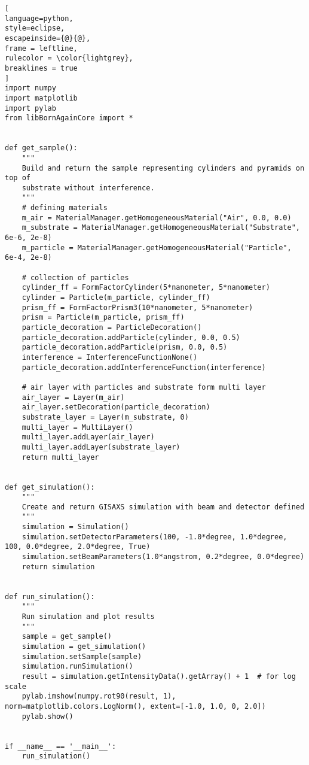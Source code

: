 \begin{lstlisting}[
language=python, 
style=eclipse, 
escapeinside={@}{@},
frame = leftline, 
rulecolor = \color{lightgrey},
breaklines = true
]
import numpy
import matplotlib
import pylab
from libBornAgainCore import *


def get_sample():
    """
    Build and return the sample representing cylinders and pyramids on top of
    substrate without interference.
    """
    # defining materials
    m_air = MaterialManager.getHomogeneousMaterial("Air", 0.0, 0.0)
    m_substrate = MaterialManager.getHomogeneousMaterial("Substrate", 6e-6, 2e-8)
    m_particle = MaterialManager.getHomogeneousMaterial("Particle", 6e-4, 2e-8)

    # collection of particles
    cylinder_ff = FormFactorCylinder(5*nanometer, 5*nanometer)
    cylinder = Particle(m_particle, cylinder_ff)
    prism_ff = FormFactorPrism3(10*nanometer, 5*nanometer)
    prism = Particle(m_particle, prism_ff)
    particle_decoration = ParticleDecoration()
    particle_decoration.addParticle(cylinder, 0.0, 0.5)
    particle_decoration.addParticle(prism, 0.0, 0.5)
    interference = InterferenceFunctionNone()
    particle_decoration.addInterferenceFunction(interference)

    # air layer with particles and substrate form multi layer
    air_layer = Layer(m_air)
    air_layer.setDecoration(particle_decoration)
    substrate_layer = Layer(m_substrate, 0)
    multi_layer = MultiLayer()
    multi_layer.addLayer(air_layer)
    multi_layer.addLayer(substrate_layer)
    return multi_layer


def get_simulation():
    """
    Create and return GISAXS simulation with beam and detector defined
    """
    simulation = Simulation()
    simulation.setDetectorParameters(100, -1.0*degree, 1.0*degree, 100, 0.0*degree, 2.0*degree, True)
    simulation.setBeamParameters(1.0*angstrom, 0.2*degree, 0.0*degree)
    return simulation


def run_simulation():
    """
    Run simulation and plot results
    """
    sample = get_sample()
    simulation = get_simulation()
    simulation.setSample(sample)
    simulation.runSimulation()
    result = simulation.getIntensityData().getArray() + 1  # for log scale
    pylab.imshow(numpy.rot90(result, 1), norm=matplotlib.colors.LogNorm(), extent=[-1.0, 1.0, 0, 2.0])
    pylab.show()


if __name__ == '__main__':
    run_simulation()

\end{lstlisting}


